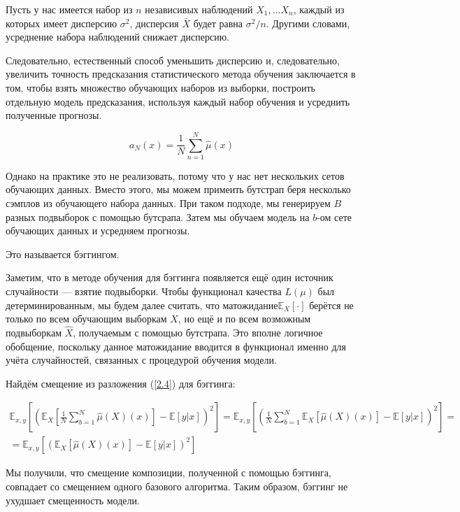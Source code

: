 \documentclass{article}
\begin{document}
Пусть у нас имеется набор из $n$ независивых наблюдений $X_1,\ldots X_n$, каждый из которых имеет дисперсию $\sigma^2$, дисперсия $\bar{X}$ будет равна $\sigma^2/n$. Другими словами, усреднение набора наблюдений снижает дисперсию.

Следовательно, естественный способ уменьшить дисперсию и, следовательно, увеличить точность предсказания статистического метода обучения заключается в том, чтобы взять множество обучающих наборов из выборки, построить отдельную модель предсказания, используя каждый набор обучения и усреднить полученные прогнозы. 

\begin{equation}
	{a}_{N}(x) = \dfrac{1}{N}\sum_{n=1}^{N}\hat{\mu}(x)
\end{equation}

Однако на практике это не реализовать, потому что у нас нет нескольких сетов обучающих данных. Вместо этого, мы можем примеить бутстрап беря несколько сэмплов из обучающего набора данных. При таком подходе, мы генерируем $B$ разных подвыборок с помощью бутсрапа. Затем мы обучаем модель на $b$-ом сете обучающих данных и усредняем прогнозы.

Это называется бэггингом.

Заметим, что в методе обучения для бэггинга появляется ещё один источник случайности — взятие подвыборки. Чтобы функционал качества $L(\mu)$ был детерминированным, мы будем далее считать, что матожидание$ \mathbb{E}_X [\cdot]$ берётся не только по всем обучающим выборкам $ X$, но ещё и по всем возможным подвыборкам $\hat{X}$, получаемым с помощью бутстрапа. Это вполне логичное обобщение, поскольку данное матожидание вводится в функционал именно для учёта случайностей, связанных с процедурой обучения модели.

Найдём смещение из разложения (\ref{2.4}) для бэггинга:

\begin{multline}
	\mathbb{E}_{x,y}\left[\left(\mathbb{E}_X\left[\frac{1}{N}\sum_{b=1}^{N}\hat{\mu}(X)(x)\right]-\mathbb{E}[y|x]\right)^2\right] = \mathbb{E}_{x,y}\left[\left(\frac{1}{N}\sum_{b=1}^{N}\mathbb{E}_X[\hat{\mu}(X)(x)] - \mathbb{E}[y|x]\right)^2\right] = \\ =\mathbb{E}_{x,y}\left[(\mathbb{E}_X\left[\hat{\mu}(X)(x)\right]-\mathbb{E}[y|x])^2\right]
\end{multline}


Мы получили, что смещение композиции, полученной с помощью бэггинга, совпадает со смещением одного базового алгоритма. Таким образом, бэггинг не ухудшает смещенность модели.
\end{document}
